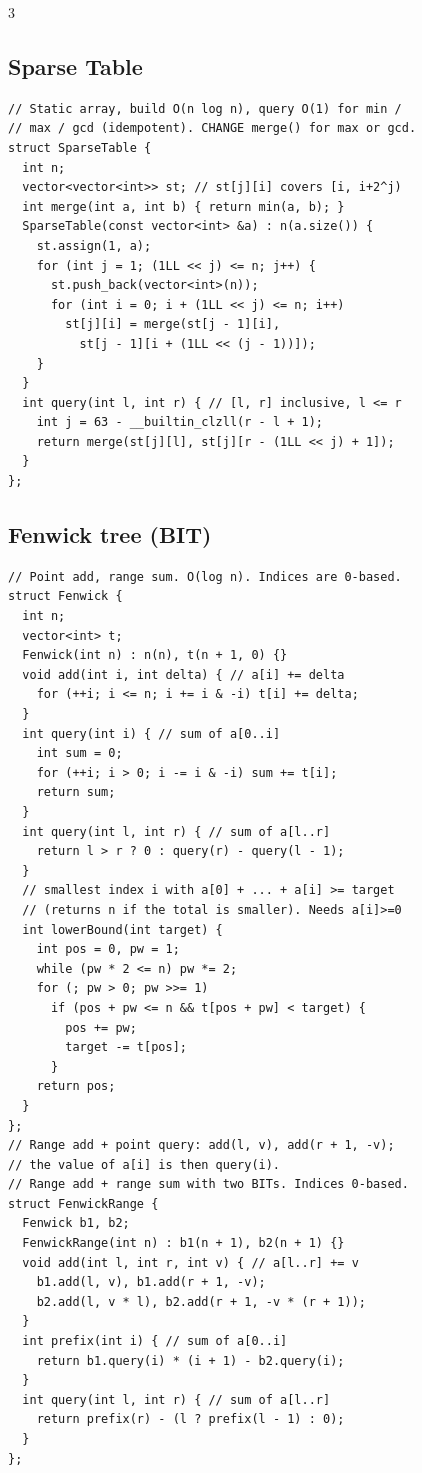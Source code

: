\documentclass[8pt, a4paper]{article}
\begin{document}
\begin{multicols*}{3}
\subsection{Sparse Table}
\begin{lstlisting}
// Static array, build O(n log n), query O(1) for min /
// max / gcd (idempotent). CHANGE merge() for max or gcd.
struct SparseTable {
  int n;
  vector<vector<int>> st; // st[j][i] covers [i, i+2^j)
  int merge(int a, int b) { return min(a, b); }
  SparseTable(const vector<int> &a) : n(a.size()) {
    st.assign(1, a);
    for (int j = 1; (1LL << j) <= n; j++) {
      st.push_back(vector<int>(n));
      for (int i = 0; i + (1LL << j) <= n; i++)
        st[j][i] = merge(st[j - 1][i],
          st[j - 1][i + (1LL << (j - 1))]);
    }
  }
  int query(int l, int r) { // [l, r] inclusive, l <= r
    int j = 63 - __builtin_clzll(r - l + 1);
    return merge(st[j][l], st[j][r - (1LL << j) + 1]);
  }
};
\end{lstlisting}
\subsection{Fenwick tree (BIT)}
\begin{lstlisting}
// Point add, range sum. O(log n). Indices are 0-based.
struct Fenwick {
  int n;
  vector<int> t;
  Fenwick(int n) : n(n), t(n + 1, 0) {}
  void add(int i, int delta) { // a[i] += delta
    for (++i; i <= n; i += i & -i) t[i] += delta;
  }
  int query(int i) { // sum of a[0..i]
    int sum = 0;
    for (++i; i > 0; i -= i & -i) sum += t[i];
    return sum;
  }
  int query(int l, int r) { // sum of a[l..r]
    return l > r ? 0 : query(r) - query(l - 1);
  }
  // smallest index i with a[0] + ... + a[i] >= target
  // (returns n if the total is smaller). Needs a[i]>=0
  int lowerBound(int target) {
    int pos = 0, pw = 1;
    while (pw * 2 <= n) pw *= 2;
    for (; pw > 0; pw >>= 1)
      if (pos + pw <= n && t[pos + pw] < target) {
        pos += pw;
        target -= t[pos];
      }
    return pos;
  }
};
// Range add + point query: add(l, v), add(r + 1, -v);
// the value of a[i] is then query(i).
// Range add + range sum with two BITs. Indices 0-based.
struct FenwickRange {
  Fenwick b1, b2;
  FenwickRange(int n) : b1(n + 1), b2(n + 1) {}
  void add(int l, int r, int v) { // a[l..r] += v
    b1.add(l, v), b1.add(r + 1, -v);
    b2.add(l, v * l), b2.add(r + 1, -v * (r + 1));
  }
  int prefix(int i) { // sum of a[0..i]
    return b1.query(i) * (i + 1) - b2.query(i);
  }
  int query(int l, int r) { // sum of a[l..r]
    return prefix(r) - (l ? prefix(l - 1) : 0);
  }
};
\end{lstlisting}

\end{multicols*}
\end{document}
